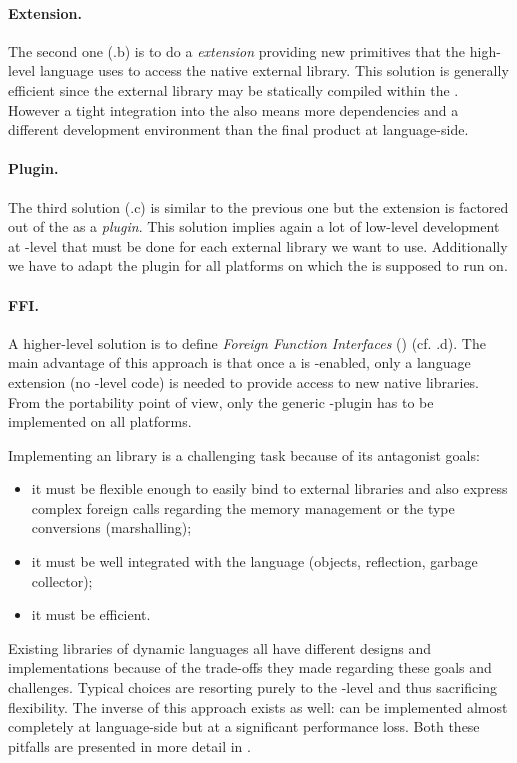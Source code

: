\paragraph{\VM Extension.}
The second one (.b) is to do a \emph{\VM extension} providing new primitives that the high-level language uses to access the native external library.
This solution is generally efficient since the external library may be statically compiled within the \VM.
However a tight integration into the \VM also means more dependencies and a different development environment than the final product at language-side.

\paragraph{\VM Plugin.}
The third solution (.c) is similar to the previous one but the extension is factored out of the \VM as a \emph{plugin}.
This solution implies again a lot of low-level development at \VM-level that must be done for each external library we want to use.
Additionally we have to adapt the plugin for all platforms on which the \VM is supposed to run on.

\paragraph{FFI.}
A higher-level solution is to define \emph{Foreign Function Interfaces} (\FFIs) (cf. .d).
The main advantage of this approach is that once a \VM is \FFI-enabled, only a language extension (no \VM-level code) is needed to provide access to new native libraries.
From the portability point of view, only the generic \FFI \VM-plugin has to be implemented on all platforms.

Implementing an \FFI library is a challenging task because of its antagonist goals:
\begin{itemize}
    \item it must be flexible enough to easily bind to external libraries and also express complex foreign calls regarding the memory management or the type conversions (marshalling);
    \item it must be well integrated with the language (objects, reflection, garbage collector);
    \item it must be efficient.
\end{itemize}
%
Existing \FFI libraries of dynamic languages all have different designs and implementations because of the trade-offs they made regarding these goals and challenges.
Typical choices are resorting purely to the \VM-level and thus sacrificing flexibility.
The inverse of this approach exists as well: \FFIs can be implemented almost completely at language-side but at a significant performance loss.
Both these pitfalls are presented in more detail in .


